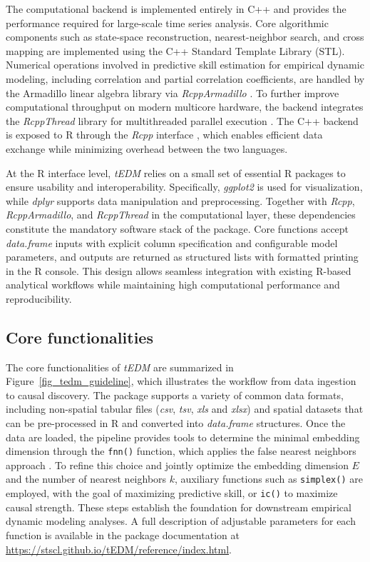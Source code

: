 \documentclass[authoryear,preprint,review,12pt]{elsarticle}
\begin{document}
The computational backend is implemented entirely in C++ and provides the performance required for large-scale time series analysis. Core algorithmic components such as state-space reconstruction, nearest-neighbor search, and cross mapping are implemented using the C++ Standard Template Library (STL). Numerical operations involved in predictive skill estimation for empirical dynamic modeling, including correlation and partial correlation coefficients, are handled by the Armadillo linear algebra library via \textit{RcppArmadillo} \citep{armadillo}. To further improve computational throughput on modern multicore hardware, the backend integrates the \textit{RcppThread} library for multithreaded parallel execution \citep{rcppthread}. The C++ backend is exposed to R through the \textit{Rcpp} interface \citep{rcpp}, which enables efficient data exchange while minimizing overhead between the two languages.

At the R interface level, \textit{tEDM} relies on a small set of essential R packages to ensure usability and interoperability. Specifically, \textit{ggplot2} is used for visualization, while \textit{dplyr} supports data manipulation and preprocessing. Together with \textit{Rcpp}, \textit{RcppArmadillo}, and \textit{RcppThread} in the computational layer, these dependencies constitute the mandatory software stack of the package. Core functions accept \textit{data.frame} inputs with explicit column specification and configurable model parameters, and outputs are returned as structured lists with formatted printing in the R console. This design allows seamless integration with existing R-based analytical workflows while maintaining high computational performance and reproducibility.

\subsection{Core functionalities}\label{sec_pkg_guideline}  

The core functionalities of \textit{tEDM} are summarized in Figure~\ref{fig_tedm_guideline}, which illustrates the workflow from data ingestion to causal discovery. The package supports a variety of common data formats, including non-spatial tabular files (\textit{csv}, \textit{tsv}, \textit{xls} and \textit{xlsx}) and spatial datasets that can be pre-processed in R and converted into \textit{data.frame} structures. Once the data are loaded, the pipeline provides tools to determine the minimal embedding dimension through the \texttt{fnn()} function, which applies the false nearest neighbors approach \citep{kennel1992fnn}. To refine this choice and jointly optimize the embedding dimension $E$ and the number of nearest neighbors $k$, auxiliary functions such as \texttt{simplex()} are employed, with the goal of maximizing predictive skill, or \texttt{ic()} to maximize causal strength. These steps establish the foundation for downstream empirical dynamic modeling analyses. A full description of adjustable parameters for each function is available in the package documentation at \url{https://stscl.github.io/tEDM/reference/index.html}. 
\end{document}
